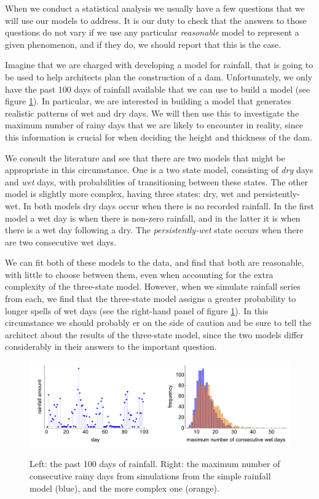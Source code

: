 \documentclass[11pt,fullpage]{book}
\begin{document}
When we conduct a statistical analysis we usually have a few questions that we will use our models to address. It is our duty to check that the answers to those questions do not vary if we use any particular \textit{reasonable} model to represent a given phenomenon, and if they do, we should report that this is the case. 

Imagine that we are charged with developing a model for rainfall, that is going to be used to help architects plan the construction of a dam. Unfortunately, we only have the past 100 days of rainfall available that we can use to build a model (see figure \ref{fig:Evaluation_sensitivityRainfall}). In particular, we are interested in building a model that generates realistic patterns of wet and dry days. We will then use this to investigate the maximum number of rainy days that we are likely to encounter in reality, since this information is crucial for when deciding the height and thickness of the dam. 

We consult the literature and see that there are two models that might be appropriate in this circumstance. One is a two state model, consisting of \textit{dry} days  and \textit{wet} days, with probabilities of transitioning between these states. The other model is slightly more complex, having three states: dry, wet and persistently-wet. In both models dry days occur when there is no recorded rainfall. In the first model a wet day is when there is non-zero rainfall, and in the latter it is when there is a wet day following a dry. The \textit{persistently-wet} state occurs when there are two consecutive wet days. 

We can fit both of these models to the data, and find that both are reasonable, with little to choose between them, even when accounting for the extra complexity of the three-state model. However, when we simulate rainfall series from each, we find that the three-state model assigns a greater probability to longer spells of wet days (see the right-hand panel of figure \ref{fig:Evaluation_sensitivityRainfall}). In this circumstance we should probably er on the side of caution and be sure to tell the architect about the results of the three-state model, since the two models differ considerably in their answers to the important question. 

\begin{figure}
\centering
\scalebox{0.4} 
{\includegraphics{Evaluation_sensitivityRainfall.pdf}}
\caption{Left: the past 100 days of rainfall. Right: the maximum number of consecutive rainy days from simulations from the simple rainfall model (blue), and the more complex one (orange).}\label{fig:Evaluation_sensitivityRainfall}
\end{figure}
\end{document}
